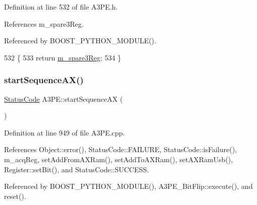 Definition at line 532 of file A3\+P\+E.\+h.



References m\+\_\+spare3\+Reg.



Referenced by B\+O\+O\+S\+T\+\_\+\+P\+Y\+T\+H\+O\+N\+\_\+\+M\+O\+D\+U\+L\+E().


\begin{DoxyCode}
532                        \{
533     \textcolor{keywordflow}{return} \hyperlink{classA3PE_a1e7e5c89f190672990ae5bece2a8b1aa}{m\_spare3Reg};
534   \}
\end{DoxyCode}
\mbox{\label{classA3PE_a91ae249ca14676f8b0832487955fcf8c}} 
\subsubsection{\texorpdfstring{start\+Sequence\+A\+X()}{startSequenceAX()}}
{\footnotesize\ttfamily \hyperlink{classStatusCode}{Status\+Code} A3\+P\+E\+::start\+Sequence\+AX (\begin{DoxyParamCaption}{ }\end{DoxyParamCaption})}



Definition at line 949 of file A3\+P\+E.\+cpp.



References Object\+::error(), Status\+Code\+::\+F\+A\+I\+L\+U\+RE, Status\+Code\+::is\+Failure(), m\+\_\+acq\+Reg, set\+Add\+From\+A\+X\+Ram(), set\+Add\+To\+A\+X\+Ram(), set\+A\+X\+Ram\+Usb(), Register\+::set\+Bit(), and Status\+Code\+::\+S\+U\+C\+C\+E\+SS.



Referenced by B\+O\+O\+S\+T\+\_\+\+P\+Y\+T\+H\+O\+N\+\_\+\+M\+O\+D\+U\+L\+E(), A3\+P\+E\+\_\+\+Bit\+Flip\+::execute(), and reset().


